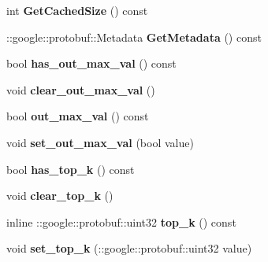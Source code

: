 \begin{DoxyCompactItemize}
int {\bfseries Get\+Cached\+Size} () const
\item 
\mbox{\label{classcaffe_1_1_arg_max_parameter_a334fd668e3276e7034d57bcd22284f2c}} 
\+::google\+::protobuf\+::\+Metadata {\bfseries Get\+Metadata} () const
\item 
\mbox{\label{classcaffe_1_1_arg_max_parameter_a9090dab48b4cf0edfe25986d42990fe3}} 
bool {\bfseries has\+\_\+out\+\_\+max\+\_\+val} () const
\item 
\mbox{\label{classcaffe_1_1_arg_max_parameter_a5e2fb2d5047751711be42f33f20735ed}} 
void {\bfseries clear\+\_\+out\+\_\+max\+\_\+val} ()
\item 
\mbox{\label{classcaffe_1_1_arg_max_parameter_a7feccb367284ebc64baffa8021f93739}} 
bool {\bfseries out\+\_\+max\+\_\+val} () const
\item 
\mbox{\label{classcaffe_1_1_arg_max_parameter_aaed7c9289060a53407838d56ef3bdda1}} 
void {\bfseries set\+\_\+out\+\_\+max\+\_\+val} (bool value)
\item 
\mbox{\label{classcaffe_1_1_arg_max_parameter_a1343bc4636a565edf84ebfbc28a0d919}} 
bool {\bfseries has\+\_\+top\+\_\+k} () const
\item 
\mbox{\label{classcaffe_1_1_arg_max_parameter_ada50bf5d66424c96020ead3e372275ff}} 
void {\bfseries clear\+\_\+top\+\_\+k} ()
\item 
\mbox{\label{classcaffe_1_1_arg_max_parameter_a09582cf28bc3b1d67f96debcdd8466a7}} 
inline \+::google\+::protobuf\+::uint32 {\bfseries top\+\_\+k} () const
\item 
\mbox{\label{classcaffe_1_1_arg_max_parameter_ad90652d28110a1e5d8d4e5409b49d634}} 
void {\bfseries set\+\_\+top\+\_\+k} (\+::google\+::protobuf\+::uint32 value)
\item 
\mbox{\label{classcaffe_1_1_arg_max_parameter_a92cdc8b454444abdb76ecf1b72818d8b}} 

\end{DoxyCompactItemize}
